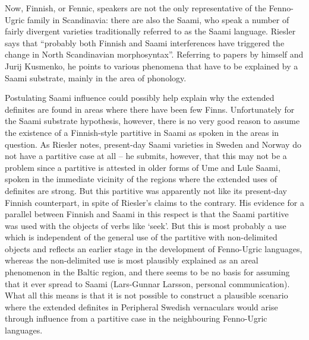 Now, Finnish, or Fennic, speakers are not the only representative of the Fenno-Ugric family in Scandinavia: there are also the Saami, who speak a number of fairly divergent varieties traditionally referred to as the Saami language. Riesler says that “probably both Finnish and Saami interferences have triggered the change in North Scandinavian morphosyntax”. Referring to papers by himself and Jurij Kusmenko, he points to various phenomena that have to be explained by a Saami substrate, mainly in the area of phonology.

Postulating Saami influence could possibly help explain why the extended definites are found in areas where there have been few Finns. Unfortunately for the Saami substrate hypothesis, however, there is no very good reason to assume the existence of a Finnish-style partitive in Saami as spoken in the areas in question. As Riesler notes, present-day Saami varieties in Sweden and Norway do not have a partitive case at all – he submits, however, that this may not be a problem since a partitive is attested in older forms of Ume and Lule Saami, spoken in the immediate vicinity of the regions where the extended uses of  definites are strong. But this partitive was apparently not like its present-day Finnish counterpart, in spite of Riesler’s claims to the contrary. His evidence for a parallel between Finnish and Saami in this respect is that the Saami partitive was used with the objects of verbs like ‘seek’. But this is most probably a use which is independent of the general use of the partitive with non-delimited objects and reflects an earlier stage in the development of Fenno-Ugric languages, whereas the non-delimited use is most plausibly explained as an areal phenomenon in the Baltic region, and there seems to be no basis for assuming that it ever spread to Saami (Lars-Gunnar Larsson, personal communication). What all this means is that it is not possible to construct a plausible scenario where the extended definites in Peripheral Swedish vernaculars would arise through influence from a partitive case in the neighbouring Fenno-Ugric languages. 

\clearpage\clearpage%



